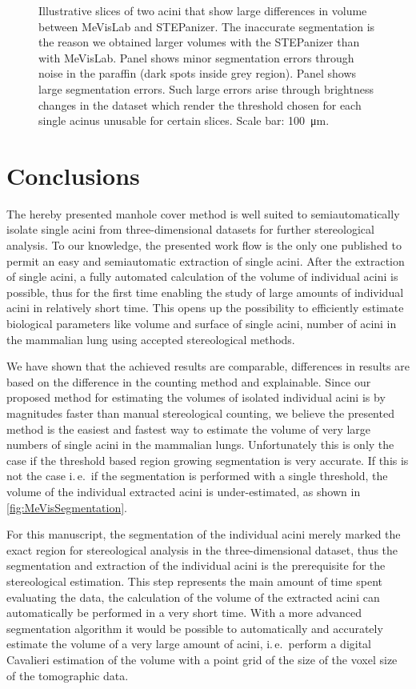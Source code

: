 \documentclass[draft,a4paper,DIVcalc,abstract,english]{scrartcl}
\newcommand{\ie}{i.\,e.\ }
\begin{document}
\begin{figure}
{		\label{subfig:60e_acinus38}%
	}%
	\hfill%
	\caption{Illustrative slices of two acini that show large differences in volume between MeVisLab and STEPanizer.
		The inaccurate segmentation is the reason we obtained larger volumes with the STEPanizer than with MeVisLab.
		Panel \protect{} shows minor segmentation errors through noise in the paraffin (dark spots inside grey region).
		Panel \protect{} shows large segmentation errors.
		Such large errors arise through brightness changes in the dataset which render the threshold chosen for each single acinus unusable for certain slices.
		Scale bar: \SI{100}{\micro\meter}.}
	\label{fig:MeVisSegmentation}
\end{figure}

\section{Conclusions}
The hereby presented manhole cover method is well suited to semiautomatically isolate single acini from three-dimensional datasets for further stereological analysis.
To our knowledge, the presented work flow is the only one published to permit an easy and semiautomatic extraction of single acini.
After the extraction of single acini, a fully automated calculation of the volume of individual acini is possible, thus for the first time enabling the study of large amounts of individual acini in relatively short time.
This opens up the possibility to efficiently estimate biological parameters like volume and surface of single acini, number of acini in the mammalian lung using accepted stereological methods.

We have shown that the achieved results are comparable, differences in results are based on the difference in the counting method and explainable.
Since our proposed method for estimating the volumes of isolated individual acini is by magnitudes faster than manual stereological counting, we believe the presented method is the easiest and fastest way to estimate the volume of very large numbers of single acini in the mammalian lungs.
Unfortunately this is only the case if the threshold based region growing segmentation is very accurate.
If this is not the case \ie if the segmentation is performed with a single threshold, the volume of the individual extracted acini is under-estimated, as shown in \autoref{fig:MeVisSegmentation}.

For this manuscript, the segmentation of the individual acini merely marked the exact region for stereological analysis in the three-dimensional dataset, thus the segmentation and extraction of the individual acini is the prerequisite for the stereological estimation.
This step represents the main amount of time spent evaluating the data, the calculation of the volume of the extracted acini can automatically be performed in a very short time.
With a more advanced segmentation algorithm it would be possible to automatically and accurately estimate the volume of a very large amount of acini, \ie perform a digital Cavalieri estimation of the volume with a point grid of the size of the voxel size of the tomographic data.
\end{document}
